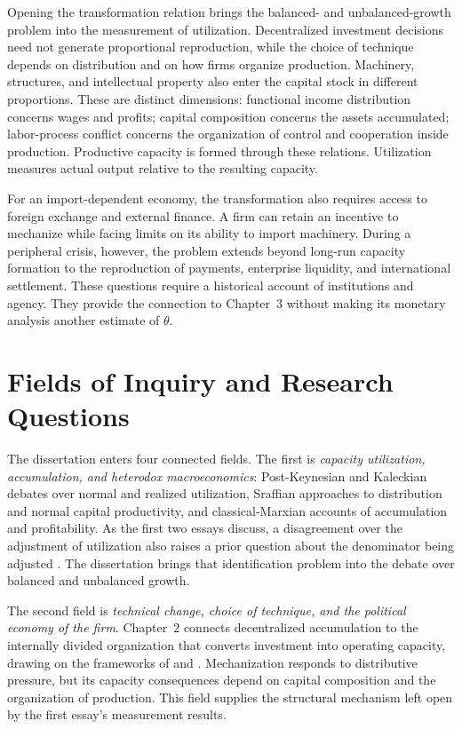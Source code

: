 Opening the transformation relation brings the balanced- and unbalanced-growth problem into the measurement of utilization. Decentralized investment decisions need not generate proportional reproduction, while the choice of technique depends on distribution and on how firms organize production. Machinery, structures, and intellectual property also enter the capital stock in different proportions. These are distinct dimensions: functional income distribution concerns wages and profits; capital composition concerns the assets accumulated; labor-process conflict concerns the organization of control and cooperation inside production. Productive capacity is formed through these relations. Utilization measures actual output relative to the resulting capacity.

For an import-dependent economy, the transformation also requires access to foreign exchange and external finance. A firm can retain an incentive to mechanize while facing limits on its ability to import machinery. During a peripheral crisis, however, the problem extends beyond long-run capacity formation to the reproduction of payments, enterprise liquidity, and international settlement. These questions require a historical account of institutions and agency. They provide the connection to Chapter~3 without making its monetary analysis another estimate of $\theta$.

\section*{Fields of Inquiry and Research Questions}

The dissertation enters four connected fields. The first is \emph{capacity utilization, accumulation, and heterodox macroeconomics}: Post-Keynesian and Kaleckian debates over normal and realized utilization, Sraffian approaches to distribution and normal capital productivity, and classical-Marxian accounts of accumulation and profitability. As the first two essays discuss, a disagreement over the adjustment of utilization also raises a prior question about the denominator being adjusted \citep{Kurz1986,Shaikh2016}. The dissertation brings that identification problem into the debate over balanced and unbalanced growth.

The second field is \emph{technical change, choice of technique, and the political economy of the firm}. Chapter~2 connects decentralized accumulation to the internally divided organization that converts investment into operating capacity, drawing on the frameworks of \citet{Okishio1961,Okishio2022} and \citet{Vidal2019,Vidal2022}. Mechanization responds to distributive pressure, but its capacity consequences depend on capital composition and the organization of production. This field supplies the structural mechanism left open by the first essay's measurement results.

